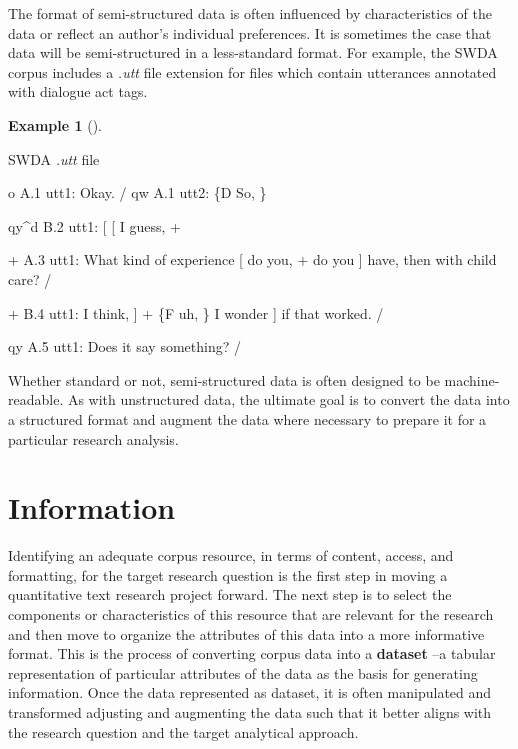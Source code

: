 \documentclass[
  letterpaper,
]{latex/krantz}
\newenvironment{Shaded}{\begin{snugshade}}{\end{snugshade}}
\newcommand{\NormalTok}[1]{\textcolor[rgb]{0.00,0.00,0.00}{#1}}
\theoremstyle{definition}
\newtheorem{example}{Example}[chapter]
\theoremstyle{remark}
\begin{document}
The format of semi-structured data is often influenced by
characteristics of the data or reflect an author's individual
preferences. It is sometimes the case that data will be semi-structured
in a less-standard format. For example, the SWDA corpus includes a
\emph{.utt} file extension for files which contain utterances annotated
with dialogue act tags.

\begin{example}[]\protect\hypertarget{exm-swda-utt}{}\label{exm-swda-utt}

SWDA \emph{.utt} file

\begin{Shaded}
\begin{Highlighting}[]
\NormalTok{o          A.1 utt1: Okay.  /}
\NormalTok{qw          A.1 utt2: \{D So, \}}

\NormalTok{qy\^{}d          B.2 utt1: [ [ I guess, +}

\NormalTok{+          A.3 utt1: What kind of experience [ do you, + do you ] have, then with child care? /}

\NormalTok{+          B.4 utt1: I think, ] + \{F uh, \} I wonder ] if that worked. /}

\NormalTok{qy          A.5 utt1: Does it say something? /}
\end{Highlighting}
\end{Shaded}

\end{example}

Whether standard or not, semi-structured data is often designed to be
machine-readable. As with unstructured data, the ultimate goal is to
convert the data into a structured format and augment the data where
necessary to prepare it for a particular research analysis.

\section{Information}\label{information}

Identifying an adequate corpus resource, in terms of content, access,
and formatting, for the target research question is the first step in
moving a quantitative text research project forward. The next step is to
select the components or characteristics of this resource that are
relevant for the research and then move to organize the attributes of
this data into a more informative format. This is the process of
converting corpus data into a \textbf{dataset} --a
tabular representation of particular attributes of the data as the basis
for generating information. Once the data represented as dataset, it is
often manipulated and transformed adjusting and augmenting the data such
that it better aligns with the research question and the target
analytical approach.
\end{document}
